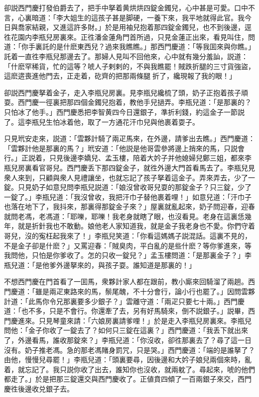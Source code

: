 卻説西門慶打發伯爵去了，把手中拏着黄烘烘四錠金鐲兒，心中甚是可愛。口中不言，心裏暗道：「李大姐生的這孩子甚是脚硬，一養下來，我平地就得此官。我今日與喬家結親，又進這許多財。」於是用袖兒抱着那四錠金鐲兒，也不到後邊，逕徃花園内李瓶兒房裏來。正徃潘金蓮角門首所過，只見金蓮正出來，看見叫住，問道：「你手裏託的是什麽東西兒？過來我瞧瞧。」那西門慶道：「等我囬來與你瞧。」託着一直徃李瓶兒那邊去了。那婦人見叫不回他來，心中就有幾分羞訕，説道：「什麽罕稀貨，忙的這等？唬人子剌剌的，不與我瞧罷！賊跌折腿的三寸貨強盜，這麽逩喪進他門去，正走着，矻齊的把那兩條腿𢱉折了，纔現報了我的眼！」

卻説西門慶拏着金子，走入李瓶兒房裏。見李瓶兒纔梳了頭，奶子正抱着孩子頑耍。西門慶一徑裏把那四個金鐲兒抱着，教他手兒撾弄。李瓶兒道：「是那裏的？只怕冰了他手。」西門慶悉把李智黄四今日還銀子，準折利錢，約這金子一節説了。這李瓶兒生怕冰着他，取了一方通花汗巾兒與他裹着耍子。

只見玳安走來，説道：「雲夥計騎了兩疋馬來，在外邊，請爹出去瞧。」西門慶道：「雲夥計他是那裏的馬？」玳安道：「他説是他哥雲參將邊上捎來的馬，只説會行。」正説着，只見後邊李嬌兒、孟玉樓，陪着大妗子并他媳婦兒鄭三姐，都來李瓶兒房裏看官哥兒。西門慶丢下那四錠金子，就徃外邊大門首看馬去了。李瓶兒見衆人來到，只顧與衆人見禮讓坐，也就忘記了孩子拏着這金子。弄來弄去，少了一錠。只見奶子如意兒問李瓶兒説道：「娘沒曾收哥兒耍的那錠金子？只三錠，少了一錠了。」李瓶兒道：「我沒曾收，我把汗巾子替他裹着哩！」如意兒道：「汗巾子也落在地下了，我抖來，那裏得那錠金子來？」屋裏就亂起來，奶子問迎春，迎春就問老馮，老馮道：「耶嚛，耶嚛！我老身就瞎了眼，也沒看見。老身在這裏恁幾年，就是折針我也不敢動。娘他老人家知道我，就是金子我老身也不愛。你們守着哥兒，沒的寃枉起我來了！」李瓶兒笑道：「你看這媽媽子説混話。這裏不見的，不是金子卻是什麽？」又罵迎春：「賊臭肉，平白亂的是些什麽？等你爹進來，等我問他，只怕是你爹收了。怎的只收一錠兒？」孟玉樓問道：「是那裏金子？」李瓶兒道：「是他爹外邊拏來的，與孩子耍。誰知道是那裏的！」

不想西門慶在門首看了一囬馬，衆夥計家人都在跟前，教小廝來回騎溜了兩趟。西門慶道：「雖是兩疋東路來的馬，鬃尾醜，不十分會行，論小行也罷了。」因問雲夥計道：「此馬你令兄那裏要多少銀子？」雲離守道：「兩疋只要七十兩。」西門慶道：「也不多，只是不會行。你還牽了去，另有好馬騎來，倒不説銀子。」説畢，西門慶進來。只見琴童來請：「六娘房裏請爹哩！」於是走入李瓶兒房裏來。李瓶兒問他：「金子你收了一錠去了？如何只三錠在這裏？」西門慶道：「我丢下就出來了，外邊看馬，誰收那錠來？」李瓶兒道：「你沒收，卻徃那裏去了？尋了這一日沒有。奶子推老馮。急的那老馮賭身罰咒，只是哭。」西門慶道：「端的是誰拏了？由他，慢慢兒尋罷！」李瓶兒道：「頭裏要尋，因後邊和大妗子娘兒兩個來時，亂着，就忘記了。我只説你收了出去，誰知你也沒收，就兩躭了。尋起來，唬的他們都走了。」於是把那三錠還交與西門慶收了。正値賁四傾了一百兩銀子來交，西門慶徃後邊收兑銀子去。

